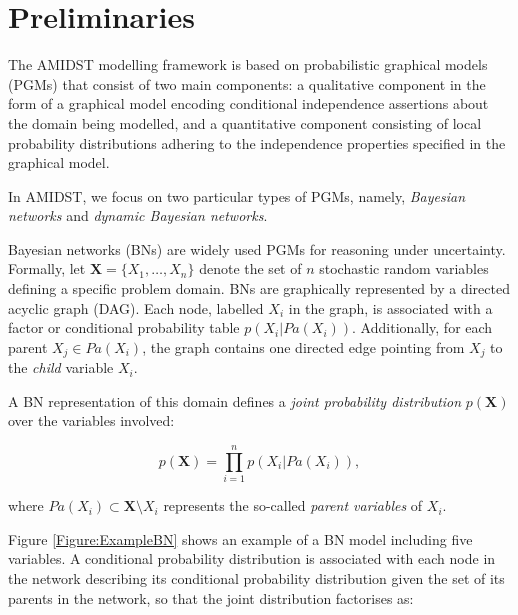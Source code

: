\section{Preliminaries}\label{sec:Preliminaries}

The AMIDST modelling framework \cite{Deliverable2.1} is based on probabilistic graphical models (PGMs) that consist of two main components: a qualitative component in the form of a graphical model encoding conditional independence assertions about the domain being modelled, and a quantitative component consisting of local probability distributions adhering to the independence properties specified in the graphical model. 

In AMIDST, we focus on two particular types of PGMs, namely, \emph{Bayesian networks} and \emph{dynamic Bayesian networks}.


Bayesian networks (BNs) \cite{JensenNielsen2007,Pearl1988} are widely used PGMs for reasoning under uncertainty. Formally, let $\mathbf{X} = \{X_1,\ldots,X_n\}$ denote the set of $n$ stochastic random variables defining a specific problem domain. BNs are graphically represented by a directed acyclic graph (DAG). Each node, labelled $X_i$ in the graph, is associated with a factor or conditional probability table $p(X_i|Pa(X_i))$. Additionally, for each parent $X_j \in Pa(X_i)$, the graph contains one directed edge pointing from $X_j$ to the \emph{child} variable $X_i$.

A BN representation of this domain defines a \emph{joint probability distribution} $p(\mathbf{X})$ over the variables involved:

\vspace{-0.15in}
$$ p(\mathbf{X}) = \prod_{i=1}^n p(X_i|Pa(X_i)),$$ 

\noindent where $Pa(X_i)\subset \bm X\setminus X_i$ represents the so-called \emph{parent variables} of $X_i$. 

Figure \ref{Figure:ExampleBN} shows an example of a BN model including five variables. A conditional probability distribution is associated with each node in the network describing its conditional probability distribution given the set of its parents in the network, so that the joint distribution factorises as:


